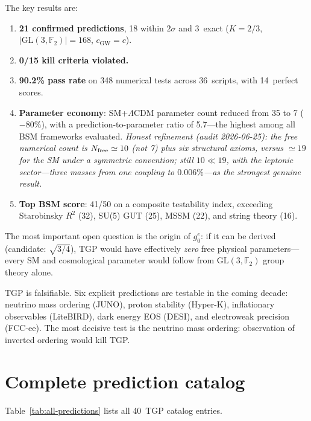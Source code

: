 \documentclass[aps,prd,twocolumn,superscriptaddress,showpacs,
  nofootinbib,floatfix,longbibliography]{revtex4-2}
\newcommand{\gone}{{g_0^e}}
\newcommand{\GL}{\mathrm{GL}(3,\mathbb{F}_2)}
\begin{document}
The key results are:
\begin{enumerate}
\item \textbf{21 confirmed predictions}, 18 within $2\sigma$ and
  3~exact ($K = 2/3$, $|\GL| = 168$, $c_\mathrm{GW} = c$).
\item \textbf{0/15 kill criteria violated.}
\item \textbf{90.2\% pass rate} on 348 numerical tests across
  36~scripts, with 14~perfect scores.
\item \textbf{Parameter economy}: SM+$\Lambda$CDM parameter count
  reduced from 35 to 7 ($-80\%$), with a prediction-to-parameter
  ratio of 5.7---the highest among all BSM frameworks evaluated.
  \emph{Honest refinement (audit 2026-06-25): the free numerical
  count is $N_{\rm free}\simeq 10$ (not 7) plus six structural axioms,
  versus $\simeq 19$ for the SM under a symmetric convention; still
  $10 \ll 19$, with the leptonic sector---three masses from one
  coupling to $0.006\%$---as the strongest genuine result.}
\item \textbf{Top BSM score}: 41/50 on a composite testability index,
  exceeding Starobinsky $R^2$ (32), SU(5) GUT (25), MSSM (22), and
  string theory (16).
\end{enumerate}

The most important open question is the origin of $\gone$: if it can
be derived (candidate: $\sqrt{3/4}$), TGP would have effectively
\emph{zero} free physical parameters---every SM and cosmological
parameter would follow from $\GL$ group theory alone.

TGP is falsifiable. Six explicit predictions are testable in the
coming decade: neutrino mass ordering (JUNO), proton stability (Hyper-K),
inflationary observables (LiteBIRD), dark energy EOS (DESI), and
electroweak precision (FCC-ee). The most decisive test is the neutrino
mass ordering: observation of inverted ordering would kill TGP.

\begin{acknowledgments}
[TBD]
\end{acknowledgments}


\appendix

\section{Complete prediction catalog}\label{app:predictions}

Table~\ref{tab:all-predictions} lists all 40~TGP catalog entries.
\end{document}

